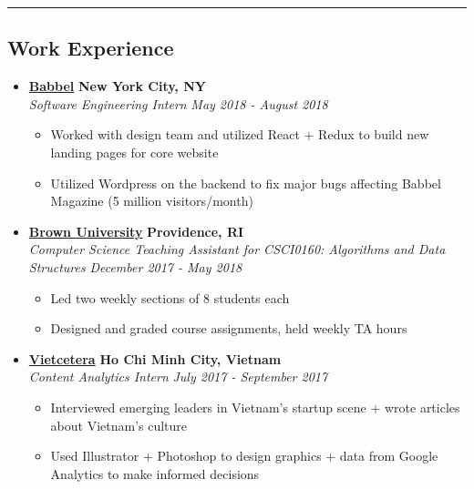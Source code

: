 \documentclass[10pt,letterpaper]{article}
\begin{document}
\hrule
\vspace{-1.0em}
\subsection*{Work Experience}
  \begin{itemize}
    \parskip=-0.5em

    \item[]
    {\href{https://www.babbel.com/}{\textbf{Babbel}} \hfill
      \textbf{New York City, NY}}
    \\
    {\emph{Software Engineering Intern} \hfill \emph{May 2018 - August 2018}}

    \begin{itemize}[label=\textbullet]
      \itemsep0em
      \item Worked with design team and utilized React + Redux to build new landing pages for core website
      \item Utilized Wordpress on the backend to fix major bugs affecting Babbel Magazine (5 million visitors/month)
    \end{itemize}


    \item[]
    {\href{https://www.brown.edu/}{\textbf{Brown University}} \hfill
      \textbf{Providence, RI}}
    \\
    {\emph{Computer Science Teaching Assistant for CSCI0160: Algorithms and Data Structures} \hfill \emph{December 2017 - May 2018}}

    \begin{itemize}[label=\textbullet]
      \itemsep0em
      \item Led two weekly sections of 8 students each
      \item Designed and graded course assignments, held weekly TA hours
    \end{itemize}

    \item[]
    {\href{http://vietcetera.com/}{\textbf{Vietcetera}} \hfill
      \textbf{Ho Chi Minh City, Vietnam}}
    \\
    {\emph{Content Analytics Intern} \hfill \emph{July 2017 - September 2017}}

    \begin{itemize}[label=\textbullet]
      \itemsep0em
      \item Interviewed emerging leaders in Vietnam's startup scene + wrote articles about Vietnam's culture 
      \item Used Illustrator + Photoshop to design graphics + data from Google Analytics to make informed decisions
    \end{itemize}


\end{itemize}
\end{document}
